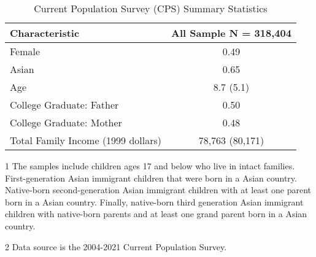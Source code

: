 \begin{table}

\caption{Current Population Survey (CPS) Summary Statistics \label{tab:sumstat1}}
\centering
\begin{threeparttable}
\begin{tabular}[t]{lc}
\toprule
Characteristic & All Sample 
N = 318,404\\
\midrule
Female & 0.49\\
Asian & 0.65\\
Age & 8.7 
(5.1)\\
College Graduate: 
 	 Father & 0.50\\
College Graduate: 
 	 Mother & 0.48\\
Total Family Income 
 	 (1999 dollars) & 78,763 
(80,171)\\
\bottomrule
\end{tabular}
\begin{tablenotes}
\item[1] The samples include children ages 17 and below who live in intact families. First-generation Asian immigrant children that were born in a Asian country. Native-born second-generation Asian immigrant children with at least one parent born in a Asian country. Finally, native-born third generation Asian immigrant children with native-born parents and at least one grand parent born in a Asian country.
\item[2] Data source is the 2004-2021 Current Population Survey.
\end{tablenotes}
\end{threeparttable}
\end{table}
